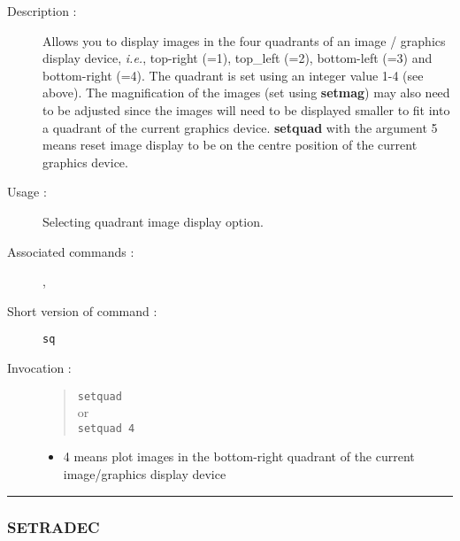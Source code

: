 \begin{description}

\item[Description :] Allows you to display images in the four
quadrants of an image / graphics display device, \emph{i.e.}, top-right
(=1), top\_left (=2), bottom-left (=3) and bottom-right (=4).  The
quadrant is set using an integer value 1-4 (see above).  The
magnification of the images (set using {\bf setmag}) may also need to
be adjusted since the images will need to be displayed smaller to fit
into a quadrant of the current graphics device.  {\bf setquad} with the
argument 5 means reset image display to be on the centre position of
the current graphics device.

\item[Usage :] Selecting quadrant image display option.

\item[Associated commands :] {\tt {}}, 
{\tt {}}

\item[Short version of command :] {\tt sq}
\item[Invocation :]

\begin{quote}{\tt  setquad }\\
or \\
{\tt setquad 4 }
\end{quote}

\begin{itemize}

\item 4 means plot images in the bottom-right quadrant of the
 current image/graphics display device
\end{itemize}

\end{description}

\hrule 
\subsubsection*{\label{SETRADEC}SETRADEC}

